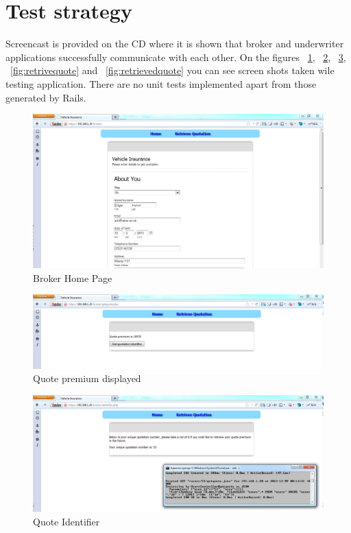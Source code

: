 \documentclass[10pt,a4paper,headinclude=true,twoside]{report}
\begin{document}
\section{Test strategy}

Screencast is provided on the CD where it is shown that broker and underwriter applications successfully communicate with each other. On the figures ~\ref{fig:brokerMain}, ~\ref{fig:quotepremium}, ~\ref{fig:QuotationNumber}, ~\ref{fig:retrivequote} and ~\ref{fig:retrievedquote} you can see screen shots taken wile testing application. There are no unit tests implemented apart from those generated by Rails.

\begin{figure}[H]
\centering
\centerline{\includegraphics[scale=0.45]{./brokerMain}}
\caption{Broker Home Page}
\label{fig:brokerMain}
\end{figure} 

\begin{figure}[H]
\centering
\centerline{\includegraphics[scale=0.45]{./quotepremium}}
\caption{Quote premium displayed}
\label{fig:quotepremium}
\end{figure} 

\begin{figure}[H]
\centering
\centerline{\includegraphics[scale=0.45]{./QuotationNumber}}
\caption{Quote Identifier}
\label{fig:QuotationNumber}
\end{figure}
\end{document}
